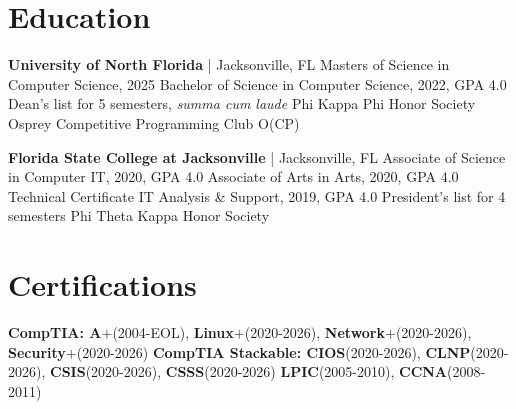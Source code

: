\documentclass[10pt]{report}
\begin{document}
\section*{Education}
\vspace{-1.5em}
\setlength{\columnsep}{-2em}
\begin{multicols}{2}
\textbf{University of North Florida} | Jacksonville, FL \newline
Masters of Science in Computer Science, 2025 \newline
Bachelor of Science in Computer Science, 2022, GPA 4.0 \newline
Dean's list for 5 semesters, \textit{summa cum laude} \newline
Phi Kappa Phi Honor Society \newline
Osprey Competitive Programming Club O(CP)
\columnbreak

\textbf{Florida State College at Jacksonville} | Jacksonville, FL \newline
Associate of Science in Computer IT, 2020, GPA 4.0 \newline
Associate of Arts in Arts, 2020, GPA 4.0 \newline
Technical Certificate IT Analysis \& Support, 2019, GPA 4.0 \newline
President's list for 4 semesters \newline
Phi Theta Kappa Honor Society
\end{multicols}
\vspace{-1em}


\section*{Certifications}
\textbf{CompTIA: A$\bm{+}$}(2004-EOL), \textbf{Linux$\bm{+}$}(2020-2026), \textbf{Network$\bm{+}$}(2020-2026), \textbf{Security$\bm{+}$}(2020-2026)\newline
\textbf{CompTIA Stackable: CIOS}(2020-2026), \textbf{CLNP}(2020-2026), \textbf{CSIS}(2020-2026), \textbf{CSSS}(2020-2026)\newline
\textbf{LPIC}(2005-2010), \textbf{CCNA}(2008-2011)
\end{document}
